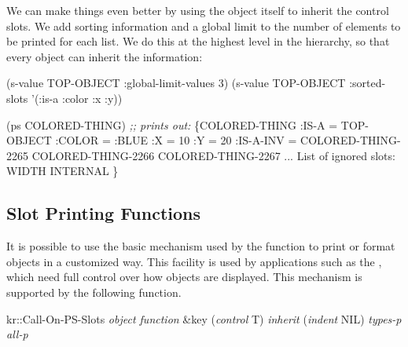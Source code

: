 We can make things even better by using the object itself to inherit the
control slots.  We add sorting information and a global limit to the number
of elements to be printed for each list.  We do this at the highest level in
the hierarchy, so that every object can inherit the information:
\begin{programexample}
(s-value TOP-OBJECT :global-limit-values 3)
(s-value TOP-OBJECT :sorted-slots
  '(:is-a :color :x :y))

(ps COLORED-THING)
{\it ;; prints out:}
\{COLORED-THING
  :IS-A =  TOP-OBJECT
  :COLOR =  :BLUE
  :X =  10
  :Y =  20
  :IS-A-INV =  COLORED-THING-2265 COLORED-THING-2266
     COLORED-THING-2267 ...
  List of ignored slots:   WIDTH INTERNAL
\}
\end{programexample}



\subsection{Slot Printing Functions}

It is possible to use the basic mechanism used by the function
 to print or format objects in a customized way.  This facility
is used by applications such as the ,
which need full control
over how objects are displayed.  This mechanism is supported by the
following function.

\begin{example}
kr::Call-On-PS-Slots {\it object  function} \&key ({\it control} T) {\it inherit} \value{function}
                     ({\it indent} NIL) {\it types-p  all-p}
\end{example}


